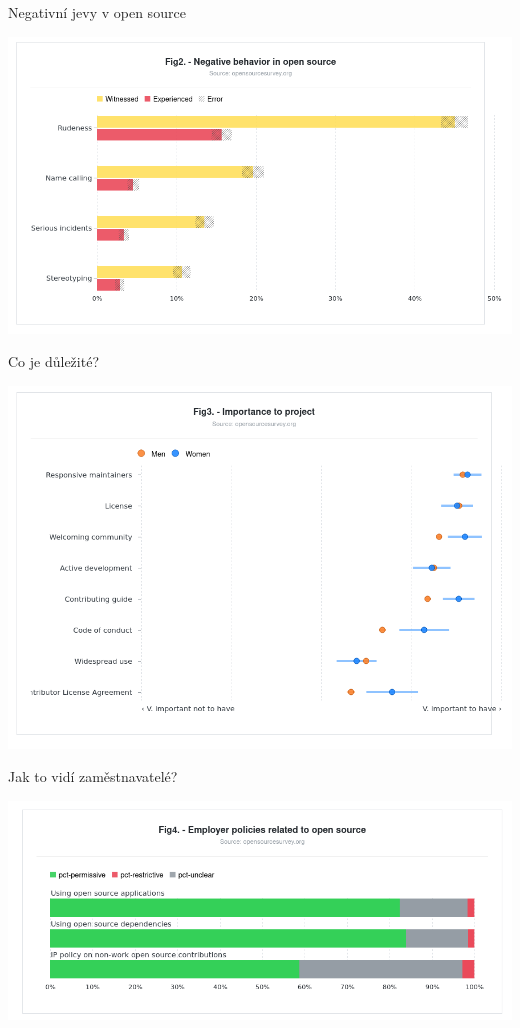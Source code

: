 \documentclass[11pt]{beamer}
\begin{document}
\begin{frame}{Negativní jevy v open source}
	\begin{center}
		\includegraphics[width=\textwidth]{images/negative_behaviour.png}
	\end{center}
\end{frame}

\begin{frame}{Co je důležité?}
	\begin{center}
		\includegraphics[width=\textwidth]{images/importance.png}
	\end{center}
\end{frame}

\begin{frame}{Jak to vidí zaměstnavatelé?}
	\begin{center}
		\includegraphics[width=\textwidth]{images/policies.png}
	\end{center}
\end{frame}
\end{document}
